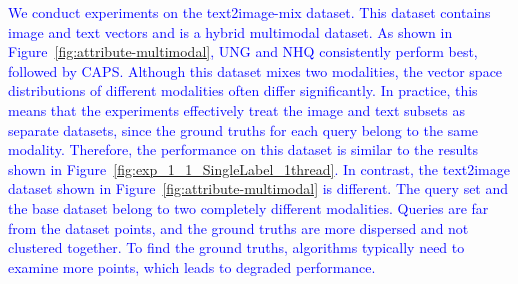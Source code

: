 \documentclass[sigconf, nonacm]{acmart}
\begin{document}
\textcolor{blue}{
	We conduct experiments on the text2image-mix dataset. This dataset contains image and text vectors and is a hybrid multimodal dataset. As shown in Figure~\ref{fig:attribute-multimodal}, UNG and NHQ consistently perform best, followed by CAPS.
	Although this dataset mixes two modalities, the vector space distributions of different modalities often differ significantly. In practice, this means that the experiments effectively treat the image and text subsets as separate datasets, since the ground truths for each query belong to the same modality. Therefore, the performance on this dataset is similar to the results shown in Figure~\ref{fig:exp_1_1_SingleLabel_1thread}.
	In contrast, the text2image dataset shown in Figure~\ref{fig:attribute-multimodal} is different. The query set and the base dataset belong to two completely different modalities. Queries are far from the dataset points, and the ground truths are more dispersed and not clustered together. To find the ground truths, algorithms typically need to examine more points, which leads to degraded performance.
}
\end{document}
